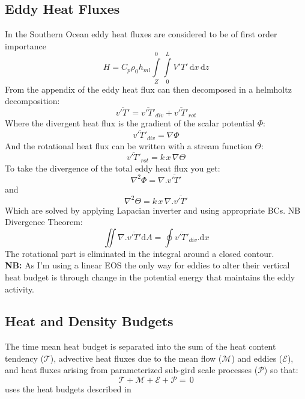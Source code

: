 \subsection{Eddy Heat Fluxes}
In the Southern Ocean eddy heat fluxes are considered to be of first order importance \citep{wunsch1999}
\begin{equation}
H=C_{p}\rho_0h_{ml}\int\limits_{Z}^{0}\int\limits_0^L V'T' \, \mathrm{d}x\, \mathrm{d}z
\label{EQ:Heat} 
\end {equation}  
From the appendix of \citet{griesel2009} the eddy heat flux can then decomposed in a helmholtz decomposition:
\begin{equation}
\overline{v'T'}=\overline{v'T'}_{div}+\overline{v'T'}_{rot}
\label{EQ:helm1}
\end{equation}
Where the divergent heat flux is the gradient of the scalar potential $\Phi$:
\begin{equation}
\overline{v'T'}_{div}= \nabla \Phi
\label{EQ:helmdiv}
\end{equation}
And the rotational heat flux can be written with a stream function $\Theta$:
\begin{equation}
\overline{v'T'}_{rot}=k\,x\,\nabla \Theta
\label{EQ:helmrot}
\end{equation}
To take the divergence of the total eddy heat flux you get:
\begin{equation}
\nabla^2\Phi=\nabla . \overline{v'T'}
\label{EQ:helmdivdiv}
\end{equation}
and
\begin{equation}
\nabla^2\Theta=k\,x\,\nabla . \overline{v'T'}
\label{EQ:helmdivrot}
\end{equation}
Which are solved by applying Lapacian inverter and using appropriate BCs.
NB Divergence Theorem:
\begin{equation}
\iint \nabla . \overline{v'T'} \mathrm{d}A = \oint \overline{v'T'}_{div} . \mathrm{d}x
\label{EQ:divtheorem}
\end{equation}
The rotational part is eliminated in the integral around a closed contour.\\
\textbf{NB:} As I'm using a linear EOS the only way for eddies to alter their vertical heat budget is through change in the potential energy that maintains the eddy activity.

\subsection{Heat and Density Budgets}
The time mean heat budget is separated into the sum of the heat content tendency ($\mathcal{T}$), advective heat fluxes due to the mean flow ($\mathcal{M}$) and eddies ($\mathcal{E}$), and heat fluxes arising from parameterized sub-gird scale processes ($\mathcal{P}$) so that:
\begin{equation}
 \mathcal{T} + \mathcal{M} + \mathcal{E} + \mathcal{P} = \, 0
\label{}
\end{equation}
\citet{morrison2013} uses the heat budgets described in \citet{wolfe2008}

